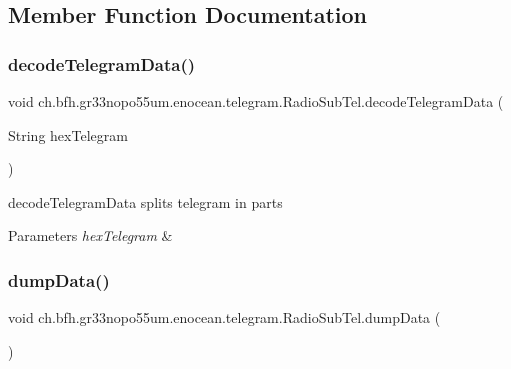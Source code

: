 \subsection{Member Function Documentation}
\hypertarget{classch_1_1bfh_1_1gr33nopo55um_1_1enocean_1_1telegram_1_1_radio_sub_tel_ac639a3f569aba0e79eae9c243e57f7a6}{}\label{classch_1_1bfh_1_1gr33nopo55um_1_1enocean_1_1telegram_1_1_radio_sub_tel_ac639a3f569aba0e79eae9c243e57f7a6} 
\subsubsection{\texorpdfstring{decode\+Telegram\+Data()}{decodeTelegramData()}}
{\footnotesize\ttfamily void ch.\+bfh.\+gr33nopo55um.\+enocean.\+telegram.\+Radio\+Sub\+Tel.\+decode\+Telegram\+Data (\begin{DoxyParamCaption}\item[{String}]{hex\+Telegram }\end{DoxyParamCaption})}

decode\+Telegram\+Data splits telegram in parts


\begin{DoxyParams}{Parameters}
{\em hex\+Telegram} & \\
\hline
\end{DoxyParams}
\hypertarget{classch_1_1bfh_1_1gr33nopo55um_1_1enocean_1_1telegram_1_1_radio_sub_tel_ad6de2cd5f0d51db8fde4be707c911f31}{}\label{classch_1_1bfh_1_1gr33nopo55um_1_1enocean_1_1telegram_1_1_radio_sub_tel_ad6de2cd5f0d51db8fde4be707c911f31} 
\subsubsection{\texorpdfstring{dump\+Data()}{dumpData()}}
{\footnotesize\ttfamily void ch.\+bfh.\+gr33nopo55um.\+enocean.\+telegram.\+Radio\+Sub\+Tel.\+dump\+Data (\begin{DoxyParamCaption}{ }\end{DoxyParamCaption})}

